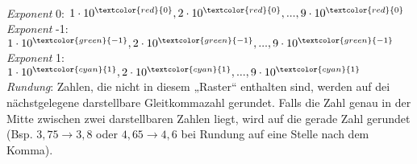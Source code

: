 \begin{enumerate}
\\
\emph{Exponent} 0: $1\cdot 10^{\textcolor{red}{0}}, 2\cdot 10^{\textcolor{red}{0}}, ... , 9\cdot 10^{\textcolor{red}{0}}$\\
\emph{Exponent} -1: $1\cdot 10^{\textcolor{green}{-1}}, 2\cdot 10^{\textcolor{green}{-1}}, ... , 9\cdot 10^{\textcolor{green}{-1}}$\\
\emph{Exponent} 1: $1\cdot 10^{\textcolor{cyan}{1}}, 2\cdot 10^{\textcolor{cyan}{1}}, ... , 9\cdot 10^{\textcolor{cyan}{1}}$\\
\emph{Rundung}: Zahlen, die nicht in diesem „Raster“ enthalten sind, werden auf dei nächstgelegene darstellbare Gleitkommazahl gerundet. Falls die Zahl genau in der Mitte zwischen zwei darstellbaren Zahlen liegt, wird auf die gerade Zahl gerundet (Bsp. $3,75 \rightarrow 3,8$ oder $4,65 \rightarrow 4,6$ bei Rundung auf eine Stelle nach dem Komma).

\end{enumerate}
